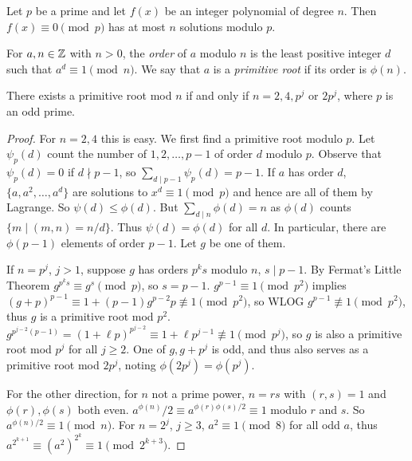 \documentclass[a4paper, 10pt]{amsart}
\begin{document}
\begin{theorem}[Lagrange]
  Let $p$ be a prime and let $f(x)$ be an integer polynomial of degree $n$. Then $f(x) \equiv 0 \pmod{p}$ has at most $n$ solutions modulo $p$.
\end{theorem}

\begin{definition}
  For $a, n \in \mathbb{Z}$ with $n > 0$, the \emph{order} of $a$ modulo $n$ is the least positive integer $d$ such that $a^d \equiv 1 \pmod{n}$. We say that $a$ is a \emph{primitive root} if its order is $\phi(n)$.
\end{definition}

\begin{theorem}
There exists a primitive root mod $n$ if and only if $n = 2, 4, p^j$ or $2p^j$, where $p$ is an odd prime.
\end{theorem}
\begin{proof}
For $n = 2, 4$ this is easy. 
We first find a primitive root modulo $p$.
Let $\psi_p(d)$ count the number of $1, 2, \dots, p - 1$ of order $d$ modulo $p$. Observe that $\psi_p(d) = 0$ if $d \nmid p - 1$, so $\sum_{d \mid p -1} \psi_p(d) = p - 1$. If $a$ has order $d$, $\{a, a^2, \dots, a^d\}$ are solutions to $x^d \equiv 1 \pmod{p}$ and hence are all of them by Lagrange. 
So $\psi(d) \leq \phi(d)$. But $\sum_{d \mid n} \phi(d) = n$ as $\phi(d)$ counts $\{m \mid (m, n) = n/d\}$. Thus $\psi(d) = \phi(d)$ for all $d$. In particular, there are $\phi(p - 1)$ elements of order $p - 1$. Let $g$ be one of them.

If $n = p^j$, $j > 1$, suppose $g$ has orders $p^ks$ modulo $n$, $s \mid p - 1$. By Fermat's Little Theorem $g^{p^k s} \equiv g^s \pmod{p}$, so $s = p - 1$. $g^{p - 1} \equiv 1 \pmod{p^2}$ implies $(g + p)^{p - 1} \equiv 1 + (p - 1)g^{p - 2}p \not \equiv 1 \pmod{p^2}$, so WLOG $g^{p -1} \not \equiv 1 \pmod{p^2}$, thus $g$ is a primitive root mod $p^2$. $g^{p^{j -2} (p - 1)} = (1 + \ell p)^{p^{j - 2}} \equiv 1 + \ell p ^{j - 1} \not \equiv 1 \pmod{p^j}$, so $g$ is also a primitive root mod $p^j$ for all $j \geq 2$. One of $g, g+p^j$ is odd, and thus also serves as a primitive root mod $2p^j$, noting $\phi(2p^j) = \phi(p^j)$.

For the other direction, for $n$ not a prime power, 
$n = rs$ with $(r, s) = 1$ and $\phi(r), \phi(s)$ both even. $a^{\phi(n)}/2 \equiv a^{\phi(r) \phi(s)/2} \equiv 1$ modulo $r$ and $s$. So $a^{\phi(n)/2} \equiv 1 \pmod{n}$. 
For $n = 2^j$, $j \geq 3$, $a^2 \equiv 1 \pmod{8}$ for all odd $a$, thus $a^{2^{k + 1}} \equiv (a^2)^{2^k} \equiv 1 \pmod{2^{k + 3}}$.
\end{proof}
\end{document}
